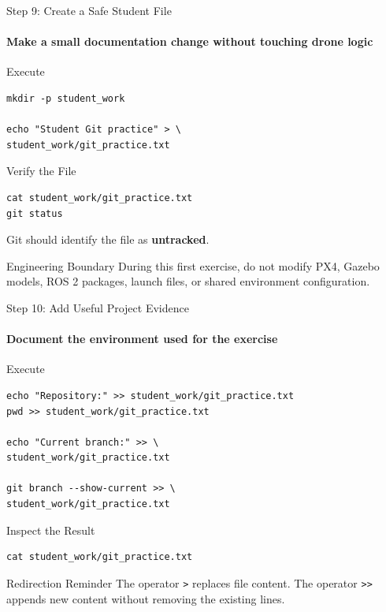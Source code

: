 \begin{frame}[fragile]{Step 9: Create a Safe Student File}
\framesubtitle{Make a small documentation change without touching drone logic}

\footnotesize

\begin{block}{Execute}
\begin{verbatim}
mkdir -p student_work

echo "Student Git practice" > \
student_work/git_practice.txt
\end{verbatim}
\end{block}

\begin{exampleblock}{Verify the File}
\begin{verbatim}
cat student_work/git_practice.txt
git status
\end{verbatim}

Git should identify the file as \textbf{untracked}.
\end{exampleblock}

\begin{alertblock}{Engineering Boundary}
During this first exercise, do not modify PX4, Gazebo models, ROS 2
packages, launch files, or shared environment configuration.
\end{alertblock}

\end{frame}

\begin{frame}[fragile]{Step 10: Add Useful Project Evidence}
\framesubtitle{Document the environment used for the exercise}

\footnotesize

\begin{block}{Execute}
\begin{verbatim}
echo "Repository:" >> student_work/git_practice.txt
pwd >> student_work/git_practice.txt

echo "Current branch:" >> \
student_work/git_practice.txt

git branch --show-current >> \
student_work/git_practice.txt
\end{verbatim}
\end{block}

\begin{exampleblock}{Inspect the Result}
\begin{verbatim}
cat student_work/git_practice.txt
\end{verbatim}
\end{exampleblock}

\begin{alertblock}{Redirection Reminder}
The operator \texttt{>} replaces file content. The operator
\texttt{>>} appends new content without removing the existing lines.
\end{alertblock}

\end{frame}


